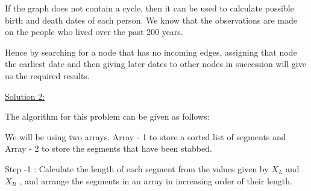 \documentclass[letterpaper,portrait,12pt]{article}
\begin{document}
\begin{flushleft}

\end{flushleft}


\begin{flushleft}
If the graph does not contain a cycle, then it can be used to calculate possible birth and death dates of each person. We know that the observations are made on the people who lived over the past 200 years.
\end{flushleft}


\begin{flushleft}

\end{flushleft}


\begin{flushleft}
Hence by searching for a node that has no incoming edges, assigning that node the earliest date and then giving later dates to other nodes in succession will give us the required results.
\end{flushleft}


\begin{flushleft}

\end{flushleft}


\begin{flushleft}
\uline{\newpage
}
\end{flushleft}


\begin{flushleft}
\uline{Solution 2:}
\end{flushleft}


\begin{flushleft}

\end{flushleft}


\begin{flushleft}
The algorithm for this problem can be given as follows:
\end{flushleft}


\begin{flushleft}
We will be using two arrays. Array - 1 to store a sorted list of segments and Array - 2 to store the segments that have been stabbed.
\end{flushleft}


\begin{flushleft}

\end{flushleft}


\begin{flushleft}
Step -1 : Calculate the length of each segment from the values given by $X_L$ and $X_R$ , and arrange the segments in an array in increasing order of their length.
\end{flushleft}
\end{document}
